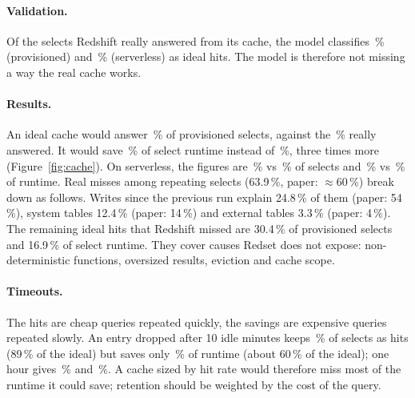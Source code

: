 \documentclass[10pt,a4paper]{article}
\begin{document}
\paragraph{Validation.} Of the selects Redshift really answered from its cache, the model classifies \ModelExplainsProv\,\% (provisioned) and \ModelExplainsServ\,\% (serverless) as ideal hits. The model is therefore not missing a way the real cache works.

\paragraph{Results.} An ideal cache would answer \IdealHitProv\,\% of provisioned selects, against the \RealHitProv\,\% really answered. It would save \IdealSavedProv\,\% of select runtime instead of \RealSavedProv\,\%, three times more (Figure~\ref{fig:cache}). On serverless, the figures are \IdealHitServ\,\% vs \RealHitServ\,\% of selects and \IdealSavedServ\,\% vs \RealSavedServ\,\% of runtime. Real misses among repeating selects (63.9\,\%, paper: $\approx$60\,\%) break down as follows. Writes since the previous run explain 24.8\,\% of them (paper: 54\,\%), system tables 12.4\,\% (paper: 14\,\%) and external tables 3.3\,\% (paper: 4\,\%). The remaining ideal hits that Redshift missed are 30.4\,\% of provisioned selects and 16.9\,\% of select runtime. They cover causes Redset does not expose: non-deterministic functions, oversized results, eviction and cache scope.

\paragraph{Timeouts.} The hits are cheap queries repeated quickly, the savings are expensive queries repeated slowly. An entry dropped after 10 idle minutes keeps \TtlTenMinHitProv\,\% of selects as hits (89\,\% of the ideal) but saves only \TtlTenMinSavedProv\,\% of runtime (about 60\,\% of the ideal); one hour gives \TtlOneHourHitProv\,\% and \TtlOneHourSavedProv\,\%. A cache sized by hit rate would therefore miss most of the runtime it could save; retention should be weighted by the cost of the query.
\end{document}
